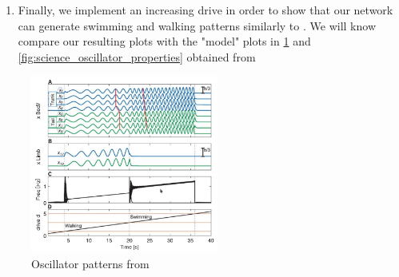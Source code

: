 \documentclass{cmc}
\begin{document}
\begin{enumerate}
\item Finally, we implement an increasing drive in order to show that our network can generate swimming and walking patterns similarly to \cite{ijspeert2007swimming}. We will know compare our resulting plots with the  "model" plots in \ref{fig:science_oscillator_patterns} and \ref{fig:science_oscillator_properties} obtained from \cite{ijspeert2007swimming}
\end{enumerate}


\begin{figure}[h]
  \centering
  \includegraphics[width=0.55\textwidth]{figures/science_oscillator_patterns}
  \caption{Oscillator patterns from \cite{ijspeert2007swimming}}
  \label{fig:science_oscillator_patterns}
\end{figure}
\end{document}
